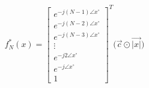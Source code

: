 \documentclass{article}
\begin{document}
\begin{align*}
    f^{*}_{N}(x) = \begin{bmatrix}
                     e^{-j(N - 1)\angle{x}^{\circ}} \\
                     e^{-j(N - 2)\angle{x}^{\circ}} \\
                     e^{-j(N - 3)\angle{x}^{\circ}} \\
                     \vdots \\
                     e^{-j2\angle{x}^{\circ}} \\
                     e^{-j\angle{x}^{\circ}} \\
                     1
                     \end{bmatrix}^{T}\Big(\vec{c} \odot \vec{|x|}\Big)
\end{align*}
\end{document}
